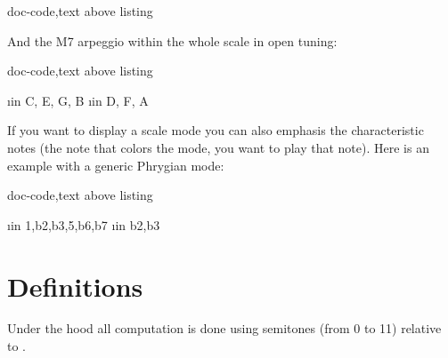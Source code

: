 \documentclass[a4paper]{article}
\begin{document}
\begin{tcblisting}{doc-code,text above listing}
  \begin{fb}[frets min = 0, frets max = 3,
      tuning={2,7,2,7,11,2},
      chord,
      legend text = {\pC Chord (open \pG)},
      fret numbers visible]
      
  \end{fb}
\end{tcblisting}

And the \pC M7 arpeggio within the whole scale in open \pG tuning:

\begin{tcblisting}{doc-code,text above listing}
  \begin{fb}[frets before = 2, frets after = 2,
      tuning={2,7,2,7,11,2},
      legend text = {\pC M7 arpeggio in open \pG tuning},
      fret numbers visible]
    \foreach \i in {C, E, G, B} {
      \note{\i}
    }
    \foreach \i in {D, F, A} {
      \note[shade]{\i}
    }
  \end{fb}
\end{tcblisting}



If you want to display a scale mode you can also emphasis the characteristic
notes (the note that colors the mode, you want to play that note). Here is
an example with a generic Phrygian mode:

\begin{tcblisting}{doc-code,text above listing}
  \begin{fb}[frets min=3, frets max=6,
      transpose = -5,
      legend text = {Phrygian scale}]
    \foreach \i in {1,b2,b3,5,b6,b7} {
      \note{\i}
    }
    \foreach \i in {b2,b3} {
      \note[limit={1},shade]{\i}
    }
  \end{fb}
\end{tcblisting}
\fi

\section{Definitions}

Under the hood all computation is done using semitones (from 0 to 11)
relative to \pC.
\end{document}
